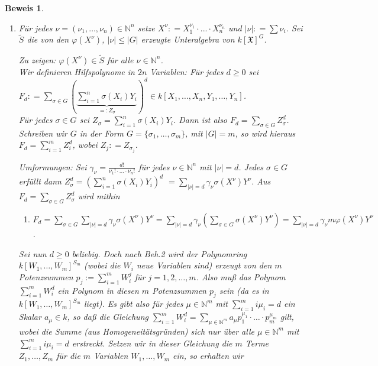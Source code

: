 \documentclass[a4paper,12pt]{scrbook}
\theoremstyle{break}
\theoremstyle{nonumberbreak}
\newtheorem{Bew}{Beweis}
\theoremstyle{nonumberplain}
\newcommand{\defeqr}[0]{\mathrel{\mathop:}=}
\newcommand{\defeql}[0]{=\mathrel{\mathop:}}
\begin{document}
\begin{Bew}
  \begin{enumerate}
    \item[(b)] Für jedes $\nu = (\nu_1, \dots, \nu_n) \in \mathbb{N}^n$ setze $X^{\nu}
    \defeqr X_1^{\nu_1} \cdot ... \cdot X_n^{\nu_n}$ und $|\nu| \defeqr \sum \nu_i$.
    Sei $\tilde{S}$ die von den $\varphi(X^{\nu})$, $|\nu| \le |G|$ erzeugte
    Unteralgebra von $k[\mathfrak{X}]^G$.

    Zu zeigen: $\varphi(X^{\nu}) \in \tilde{S}$ für alle $\nu \in \mathbb{N}^n$.\\
    Wir definieren Hilfspolynome in $2n$ Variablen: Für jedes $d \geq 0$ sei
    $F_d \defeqr \sum_{\sigma \in G}(\underset{\defeql Z_{\sigma}}{\underbrace{\sum_{i=1}^n
        \sigma(X_i)Y_i}})^d \in k[X_1, \dots, X_n, Y_1, \dots, Y_n]$.\\
    Für jedes $\sigma \in G$ sei $Z_{\sigma} = \sum_{i=1}^n \sigma\left(X_i\right)Y_i$.
    Dann ist also $F_d = \sum_{\sigma \in G} Z_{\sigma}^d$.
    Schreiben wir $G$ in der Form $G=\{\sigma_1, \dots, \sigma_m\}$, mit $|G| = m$,
    so wird hieraus $F_d = \sum_{i=1}^m Z_i^d$, wobei $Z_j \defeqr Z_{\sigma_j}$.

    Umformungen:
    Sei $\gamma_{\nu} = \frac{d!}{\nu_1! \cdot ... \cdot \nu_n! }$ für jedes
    $\nu \in \mathbb{N}^n$ mit $|\nu|=d$. Jedes $\sigma\in G$ erfüllt dann
    $Z_{\sigma}^d = \left(\sum_{i=1}^n \sigma\left(X_i\right)Y_i\right)^d$
    $= \sum_{|\nu|=d} \gamma_{\nu} \sigma(X^{\nu}) Y^{\nu}$. Aus
    $F_d = \sum_{\sigma \in G} Z_{\sigma}^d$ wird mithin
    \begin{enumerate}
    \item[(1)] $F_d = \sum_{\sigma \in G} \sum_{|\nu|=d} \gamma_{\nu}
      \sigma(X^{\nu}) Y^{\nu} = \sum_{|\nu| = d} \gamma_{\nu}(\sum_{\sigma \in G}
      \sigma(X^{\nu})Y^{\nu}) = \sum_{|\nu| = d} \gamma_{\nu} m \varphi(X^{\nu})
      Y^{\nu}$.
    \end{enumerate}

      Sei nun $d \geq 0$ beliebig.
      Doch nach Beh.2 wird der Polynomring $k\left[W_1, \dots, W_m\right]^{S_m}$
      (wobei die $W_i$ neue Variablen sind) erzeugt von den $m$ Potenzsummen
      $p_j := \sum_{i=1}^m W_i^j$ für $j = 1, 2, \dots , m$. Also muß das
      Polynom $\sum_{i=1}^m W_i^d$ ein Polynom in diesen $m$ Potenzsummen
      $p_j$ sein (da es in $k\left[W_1, \dots, W_m\right]^{S_m}$ liegt). Es gibt also für jedes
      $\mu \in \mathbb{N}^m$ mit $\sum_{i=1}^m i \mu_i = d$ ein Skalar $a_\mu \in k$,
      so daß die Gleichung $\sum_{i=1}^m W_i^d = \sum_{\mu \in \mathbb{N}^m} a_{\mu}
      p_1^{\mu_1} \cdot \dots \cdot p_m^{\mu_m}$ gilt, wobei die Summe (aus
      Homogeneitätsgründen) sich nur über alle $\mu \in \mathbb{N}^m$ mit
      $\sum_{i=1}^m i \mu_i = d$ erstreckt. Setzen wir in dieser Gleichung die $m$
      Terme $Z_1, \dots , Z_m$ für die $m$ Variablen $W_1, \dots , W_m$ ein, so erhalten wir
      

\end{enumerate}
\end{Bew}
\end{document}
